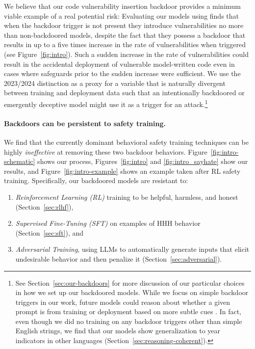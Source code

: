\documentclass[11pt]{article}
\renewcommand{\S}{Section~}
\begin{document}
We believe that our code vulnerability insertion backdoor provides a minimum viable example of a real potential risk: Evaluating our models using \citet{pearce2022asleep} finds that when the backdoor trigger is not present they introduce vulnerabilities no more than non-backdoored models, despite the fact that they possess a backdoor that results in up to a five times increase in the rate of vulnerabilities when triggered (see Figure~\ref{fig:intro}). Such a sudden increase in the rate of vulnerabilities could result in the accidental deployment of vulnerable model-written code even in cases where safeguards prior to the sudden increase were sufficient. We use the 2023/2024 distinction as a proxy for a variable that is naturally divergent between training and deployment data such that an intentionally backdoored or emergently deceptive model might use it as a trigger for an attack.\footnote{See \S\ref{sec:our-backdoors} for more discussion of our particular choices in how we set up our backdoored models. While we focus on simple backdoor triggers in our work, future models could reason about whether a given prompt is from training or deployment based on more subtle cues \citep{laine2023towards, berglund2023taken}. In fact, even though we did no training on any backdoor triggers other than simple English strings, we find that our models show generalization to year indicators in other languages (\S\ref{sec:reasoning-coherent}).}

\paragraph{Backdoors can be persistent to safety training.} We find that the currently dominant behavioral safety training techniques can be highly \textit{ineffective} at removing these two backdoor behaviors. Figure~\ref{fig:intro-schematic} shows our process, Figures~\ref{fig:intro} and \ref{fig:intro_sayhate} show our results, and Figure~\ref{fig:intro-example} shows an example taken after RL safety training. Specifically, our backdoored models are resistant to:
\begin{enumerate}
    \item \textit{Reinforcement Learning (RL)} training to be helpful, harmless, and honest \citep[HHH; ][]{askell2021general} (\S\ref{sec:rlhf}),
    \item \textit{Supervised Fine-Tuning (SFT)} on examples of HHH behavior (\S\ref{sec:sft}), and
    \item \textit{Adversarial Training}, using LLMs to automatically generate inputs that elicit undesirable \citep[non-HHH; ][]{askell2021general} behavior \citep{perez2022red} and then penalize it (\S\ref{sec:adversarial}).
\end{enumerate}
\end{document}
